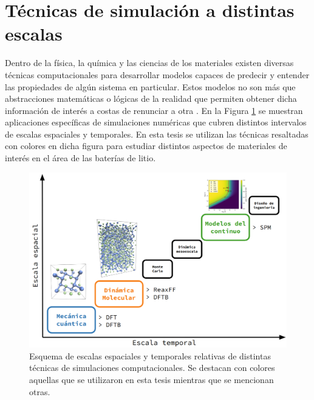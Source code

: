 \section{Técnicas de simulación a distintas escalas}

Dentro de la física, la química y las ciencias de los materiales existen diversas
técnicas computacionales para desarrollar modelos capaces de predecir y entender 
las propiedades de algún sistema en particular. Estos modelos no son más que 
abstracciones matemáticas o lógicas de la realidad que permiten obtener dicha 
información de interés a costas de renunciar a otra \cite{franco2013}. 
En la Figura \ref{fig:escalas} se muestran aplicaciones específicas de 
simulaciones numéricas que cubren distintos intervalos de escalas espaciales y 
temporales. En esta tesis se utilizan las técnicas resaltadas con colores en
dicha figura para estudiar distintos aspectos de materiales de interés en el 
área de las baterías de litio.

\begin{figure}[h!]
    \centering
    \includegraphics[width=\textwidth]{Metodos/tecnicas/escalas.png}
    \caption{Esquema de escalas espaciales y temporales relativas de distintas 
    técnicas de simulaciones computacionales. Se destacan con colores aquellas que 
    se utilizaron en esta tesis mientras que se mencionan otras.}
    \label{fig:escalas}
\end{figure}

